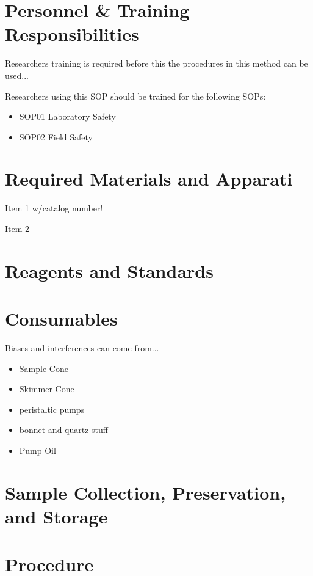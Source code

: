 \documentclass[12pt]{../SOP3}\usepackage[]{graphicx}\usepackage[]{color}
\begin{document}
\section{Personnel \& Training Responsibilities}

\NP Researchers training is required before this the procedures in this method can be used... 

\NP Researchers using this SOP should be trained for the following SOPs:

\begin{itemize}
  \item SOP01 Laboratory Safety
  \item SOP02 Field Safety
\end{itemize}

\section{Required Materials and Apparati}

\NP Item 1 w/catalog number!

\NP Item 2

\section{Reagents and Standards}

\section{Consumables}

\NP Biases and interferences can come from...

\begin{itemize}
  \item Sample Cone
  \item Skimmer Cone
  \item peristaltic pumps
  \item bonnet and quartz stuff
  \item Pump Oil
\end{itemize}




\section{Sample Collection, Preservation, and Storage}

\section{Procedure}
\end{document}
